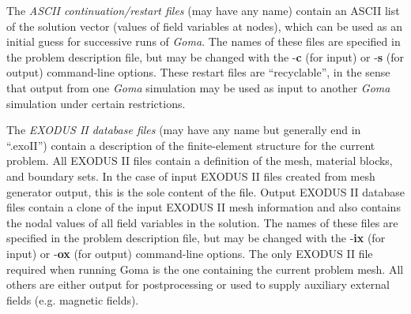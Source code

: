 The \emph{ASCII continuation/restart files} (may have any name) contain an ASCII list of the solution vector (values of field variables at nodes), which can be used as an initial guess for successive runs of \emph{Goma}. The names of these files are specified in the problem description file, but may be changed with the -\textbf{c} (for input) or -\textbf{s} (for output) command-line options. These restart files are “recyclable”, in the sense that output from one \emph{Goma} simulation may be used as input to another \emph{Goma} simulation under certain restrictions.

The \emph{EXODUS II database files} (may have any name but generally end in “.exoII”) contain a description of the finite-element structure for the current problem. All EXODUS II files contain a definition of the mesh, material blocks, and boundary sets. In the case of input EXODUS II files created from mesh generator output, this is the sole content of the file. Output EXODUS II database files contain a clone of the input EXODUS II mesh information and also contains the nodal values of all field variables in the solution. The names of these files are specified in the problem description file, but may be changed with the -\textbf{ix} (for input) or -\textbf{ox} (for output) command-line options. The only EXODUS II file required when running Goma is the one containing the current problem mesh. All others are either output for postprocessing or used to supply auxiliary external fields (e.g. magnetic fields).